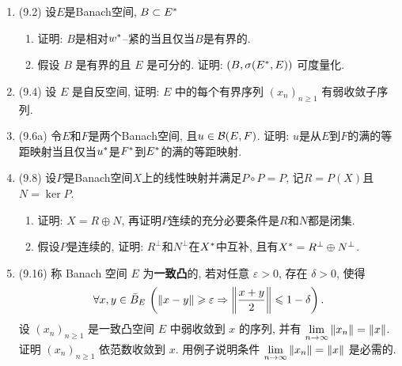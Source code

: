 \begin{enumerate}[label=\textbf{\arabic*.}, ref=\arabic*]
\begin{enumerate}[(1)]
	      \end{enumerate}
	\item (9.2) 设$ E $是Banach空间, $ B\subset E^{*} $
	      \begin{enumerate}[(1)]
		      \item 证明: $ B $是相对$ w^{*} $--紧的当且仅当$ B $是有界的.
		      \item 假设 $ B $ 是有界的且 $ E $ 是可分的. 证明: $ (B, \sigma(E^{*}, E)) $ 可度量化.
	      \end{enumerate}
	\item (9.4) 设 $ E $ 是自反空间, 证明: $ E $ 中的每个有界序列 $ (x_{n})_{n\geqslant1} $ 有弱收敛子序列.
	\item (9.6a) 令$ E $和$ F $是两个Banach空间, 且$ u\in\mathcal{B}(E,F) $. 证明: $ u $是从$ E $到$ F $的满的等距映射当且仅当$ u^{*} $是$ F^{*} $到$ E^{*} $的满的等距映射.
	\item (9.8) 设$ P $是Banach空间$ X $上的线性映射并满足$ P\circ P=P $, 记$ R=P(X) $且$ N=\ker P $.
	      \begin{enumerate}[(1)]
		      \item 证明: $ X=R\oplus N $, 再证明$ P $连续的充分必要条件是$ R $和$ N $都是闭集.
		      \item 假设$ P $是连续的, 证明: $ R^\bot $和$ N^\bot $在$ X^{*} $中互补, 且有$ X^{*}=R^\bot\oplus N^\bot $.
	      \end{enumerate}
	\item (9.16) 称 Banach 空间 $ E $ 为\textbf{一致凸}的, 若对任意 $ \varepsilon>0 $, 存在 $ \delta>0 $, 使得
	      \[
		      \forall x, y\in\bar{B}_{E}\,\left(\left\| x-y \right\|\geqslant\varepsilon\Rightarrow \left\| \frac{x+y}{2} \right\|\leqslant 1-\delta\right).
	      \]
	      设 $ (x_{n})_{n\geqslant1} $ 是一致凸空间 $ E $ 中弱收敛到 $ x $ 的序列, 并有 $ \lim\limits_{n\to\infty}\left\| x_{n} \right\|=\left\| x \right\| $. 证明 $ (x_{n})_{n\geqslant1} $ 依范数收敛到 $ x $. 用例子说明条件 $ \lim\limits_{n\to\infty}\left\| x_{n} \right\|=\left\| x \right\| $ 是必需的.
\end{enumerate}